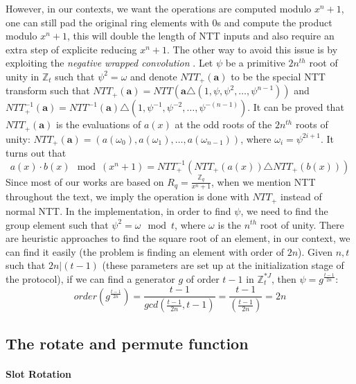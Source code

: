 \begin{description}
  However, in our contexts, we want the operations are computed modulo
  \(x^{n} + 1\), one can still pad the original ring elements with 0s and
  compute the product modulo \(x^{n} + 1\), this will double the length of NTT
  inputs and also require an extra step of explicite reducing \(x^{n} + 1\). The
  other way to avoid this issue is by exploiting the \textit{negative wrapped
    convolution} \cite{lyubashevsky2008swifft}. Let \(\psi\) be a primitive
  \(2n^{th}\) root of unity in \(\mathbb{Z}_{t}\) such that
  \(\psi^{2} = \omega\) and denote \(NTT_{+}(\mathbf{a})\) to be the special NTT
  transform such that
  \(NTT_{+}(\mathbf{a}) = NTT(\mathbf{a} \triangle (1, \psi, \psi^{2}, \dots,
  \psi^{n-1}))\) and
  \(NTT_{+}^{-1}(\mathbf{a}) = NTT^{-1}(\mathbf{a}) \triangle (1, \psi^{-1},
  \psi^{-2}, \dots, \psi^{-(n-1)})\). It can be proved that
  \(NTT_{+}(\mathbf{a})\) is the evaluations of \(a(x)\) at the odd roots of the
  \(2n^{th}\) roots of unity:
  \(NTT_{+}(\mathbf{a}) = (a(\omega_{0}), a(\omega_{1}), \dots,
  a(\omega_{n-1}))\), where \(\omega_{i} = \psi^{2i + 1}\). It turns out that
  \[
a(x) \cdot b(x) \mod (x^{n} + 1) = NTT_{+}^{-1}(NTT_{+}(a(x)) \triangle NTT_{+}(b(x)))
  \]
  Since most of our works are based on
  \(R_{q} = \frac{\mathbb{Z}_{q}}{x^{n} + 1}\), when we mention NTT throughout
  the text, we imply the operation is done with \(NTT_{+}\) instead of normal
  NTT. In the implementation, in order to find \(\psi\), we need to find the
  group element such that \(\psi^{2} = \omega \mod t\), where \(\omega\) is the
  \(n^{th}\) root of unity. There are heuristic approaches to find the square
  root of an element, in our context, we can find it easily (the problem is
  finding an element with order of \(2n\)). Given \(n, t\) such that
  \(2n | (t - 1)\) (these parameters are set up at the initialization stage of
  the protocol), if we can find a generator \(g\) of order \(t -1\) in
  \(\mathbb{Z}_t^{*J}\), then \(\psi = g^{\frac{t-1}{2n}}\):
\[
  order(g^{\frac{t-1}{2n}}) = \frac{t-1}{gcd(\frac{t-1}{2n},t-1)} =
  \frac{t-1}{(\frac{t-1}{2n})} = 2n
\]

\end{description}






\subsection{The rotate and permute function}
\label{sec:6rotate}

\paragraph{Slot Rotation}

